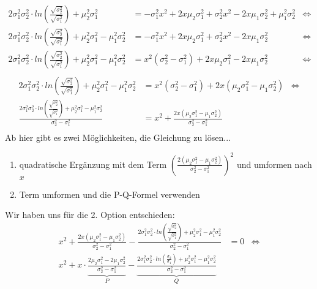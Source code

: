 \documentclass[12pt]{article}
\begin{document}
\begin{align*}
2 \sigma_1^2 \sigma_2^2 \cdot ln \left(\frac{\sqrt{\sigma_2^2}}{\sqrt{\sigma_1^2}}\right) + \mu_2^2\sigma_1^2 &= -\sigma_1^2x^2 +2x\mu_2\sigma_1^2 + \sigma_2^2 x^2 -2x\mu_1\sigma_2^2 + \mu_1^2\sigma_2^2 &\Leftrightarrow\\
2 \sigma_1^2 \sigma_2^2 \cdot ln \left(\frac{\sqrt{\sigma_2^2}}{\sqrt{\sigma_1^2}}\right) + \mu_2^2\sigma_1^2 - \mu_1^2\sigma_2^2&= -\sigma_1^2x^2 +2x\mu_2\sigma_1^2 + \sigma_2^2 x^2 -2x\mu_1\sigma_2^2 &\Leftrightarrow\\
2 \sigma_1^2 \sigma_2^2 \cdot ln \left(\frac{\sqrt{\sigma_2^2}}{\sqrt{\sigma_1^2}}\right) + \mu_2^2\sigma_1^2 - \mu_1^2\sigma_2^2&= x^2 (\sigma_2^2-\sigma_1^2) +2x\mu_2\sigma_1^2 -2x\mu_1\sigma_2^2 &\Leftrightarrow\\
\end{align*}
\newpage
\begin{align*}
2 \sigma_1^2 \sigma_2^2 \cdot ln \left(\frac{\sqrt{\sigma_2^2}}{\sqrt{\sigma_1^2}}\right) + \mu_2^2\sigma_1^2 - \mu_1^2\sigma_2^2&= x^2 (\sigma_2^2-\sigma_1^2) + 2x (\mu_2\sigma_1^2 - \mu_1\sigma_2^2) &\Leftrightarrow\\
\frac{2 \sigma_1^2 \sigma_2^2 \cdot ln \left(\frac{\sqrt{\sigma_2^2}}{\sqrt{\sigma_1^2}}\right) + \mu_2^2\sigma_1^2 - \mu_1^2\sigma_2^2}{\sigma_2^2-\sigma_1^2} &= x^2 + \frac{2x(\mu_2\sigma_1^2 - \mu_1\sigma_2^2)}{\sigma_2^2-\sigma_1^2}\\
\end{align*}
Ab hier gibt es zwei M\"oglichkeiten, die Gleichung zu l\"osen...
\begin{enumerate}
\item quadratische Erg\"anzung mit dem Term $\left(\frac{2(\mu_2\sigma_1^2 - \mu_1\sigma_2^2)}{\sigma_2^2-\sigma_1^2}\right)^2$ und umformen nach $x$
\item Term umformen und die P-Q-Formel verwenden
\end{enumerate}
Wir haben uns f\"ur die 2. Option entschieden:
\begin{align*}
x^2 + \frac{2x(\mu_2\sigma_1^2 - \mu_1\sigma_2^2)}{\sigma_2^2-\sigma_1^2} - \frac{2 \sigma_1^2 \sigma_2^2 \cdot ln \left(\frac{\sqrt{\sigma_2^2}}{\sqrt{\sigma_1^2}}\right) + \mu_2^2\sigma_1^2 - \mu_1^2\sigma_2^2}{\sigma_2^2-\sigma_1^2} &= 0 &\Leftrightarrow\\
x^2 + x \cdot \underbrace{\frac{2\mu_2\sigma_1^2 - 2\mu_1\sigma_2^2}{\sigma_2^2-\sigma_1^2}}_{P} - \underbrace{\frac{2 \sigma_1^2 \sigma_2^2 \cdot ln \left(\frac{\sigma_2}{\sigma_1}\right) + \mu_2^2\sigma_1^2 - \mu_1^2\sigma_2^2}{\sigma_2^2-\sigma_1^2}}_{Q}\\
\end{align*}
\end{document}
